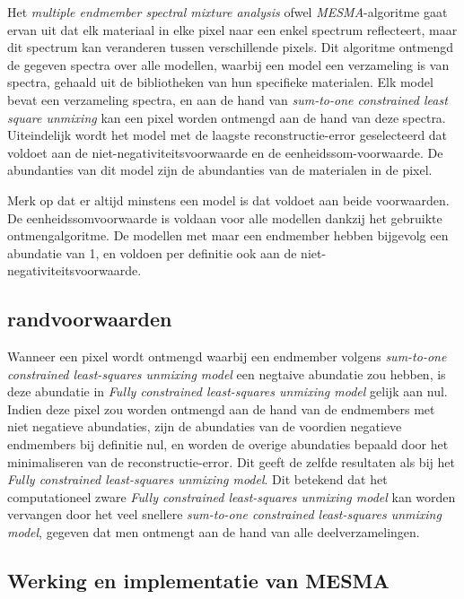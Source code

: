 \documentclass[12pt]{report}
\begin{document}
Het \textit{multiple endmember spectral mixture analysis} ofwel \textit{MESMA}-algoritme gaat ervan uit dat elk materiaal in elke pixel naar een enkel spectrum reflecteert, maar dit spectrum kan veranderen tussen verschillende pixels. Dit algoritme ontmengd de gegeven spectra over alle modellen, waarbij een model een verzameling is van spectra, gehaald uit de bibliotheken van hun specifieke materialen. Elk model bevat een verzameling spectra, en aan de hand van \textit{sum-to-one constrained least square unmixing} kan een pixel worden ontmengd aan de hand van deze spectra. Uiteindelijk wordt het model  met de laagste reconstructie-error geselecteerd dat voldoet aan de niet-negativiteitsvoorwaarde en de eenheidssom-voorwaarde. De abundanties van dit model zijn de abundanties van de materialen in de pixel.

Merk op dat er altijd minstens een model is dat voldoet aan beide voorwaarden. De eenheidssomvoorwaarde is voldaan voor alle modellen dankzij het gebruikte ontmengalgoritme. De modellen met maar een endmember hebben bijgevolg een abundatie van 1, en voldoen per definitie ook aan de niet-negativiteitsvoorwaarde.


\subsection{randvoorwaarden}

Wanneer een pixel wordt ontmengd waarbij een endmember volgens \textit{sum-to-one constrained least-squares unmixing model} een negtaive abundatie zou hebben, is deze abundatie in \textit{Fully constrained least-squares unmixing model} gelijk aan nul. Indien deze pixel zou worden ontmengd aan de hand van de endmembers met niet negatieve abundaties, zijn de abundaties van de voordien negatieve endmembers bij definitie nul, en worden de overige abundaties bepaald door het minimaliseren van de reconstructie-error. Dit geeft de zelfde resultaten als bij het \textit{Fully constrained least-squares unmixing model}. Dit betekend dat het computationeel zware \textit{Fully constrained least-squares unmixing model} kan worden vervangen door het veel snellere \textit{sum-to-one constrained least-squares unmixing model}, gegeven dat men ontmengt aan de hand van alle deelverzamelingen. 



\subsection{Werking en implementatie van MESMA}
\end{document}
